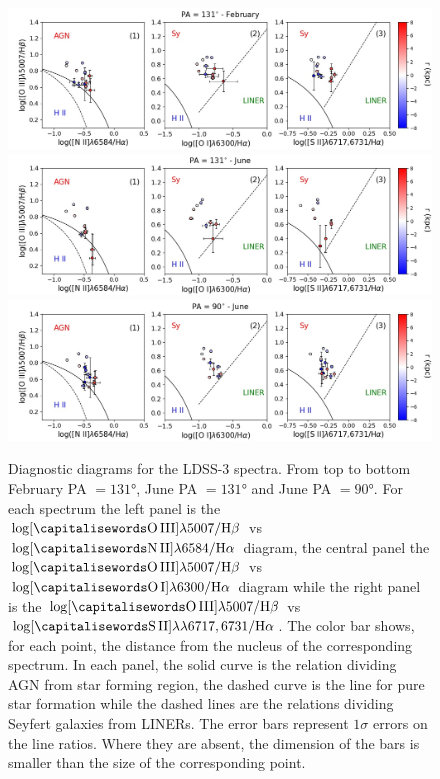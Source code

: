 \documentclass[../main.tex]{subfiles}
\begin{document}
\begin{figure}
\centering
\includegraphics[width=\textwidth]{images/paper3/PA131_2016_diagnostic.jpg}\\ 
\includegraphics[width=\textwidth]{images/paper3/PA131_diagnostic.jpg}\\ 
\includegraphics[width=\textwidth]{images/paper3/PA90_diagnostic.jpg}\\ 
\caption[]{Diagnostic diagrams for the LDSS-3 spectra. From top to bottom February PA $=\ang{131}$, June PA $=\ang{131}$ and June PA $=\ang{90}$. For each spectrum the left panel is the  $\log [\rm \ion{O}{III}]\lambda5007/\Hb$ vs $\log [\rm \ion{N}{II}]\lambda6584/\Ha$ diagram, the central panel the $\log [\rm \ion{O}{III}]\lambda5007/\Hb$ vs $\log [\rm \ion{O}{I}]\lambda6300/\Ha$ diagram while the right panel is the $\log [\rm \ion{O}{III}]\lambda5007/\Hb$ vs $\log [\rm \ion{S}{II}]\lambda\lambda6717,6731/\Ha$. The color bar shows, for each point, the distance from the nucleus of the corresponding spectrum.
In each panel, the solid curve is the \citet{Kewley01} relation dividing AGN from star forming region, the dashed curve is the \citet{Kauffmann03} line for pure star formation while the dashed lines are the \citet{Kewley06} relations dividing Seyfert galaxies from LINERs.
The error bars represent $1\sigma$ errors on the line ratios. Where they are absent, the dimension of the bars is smaller than the size of the corresponding point. 
}
\label{fig:pap3_diagnostic}
\end{figure} 
\end{document}
